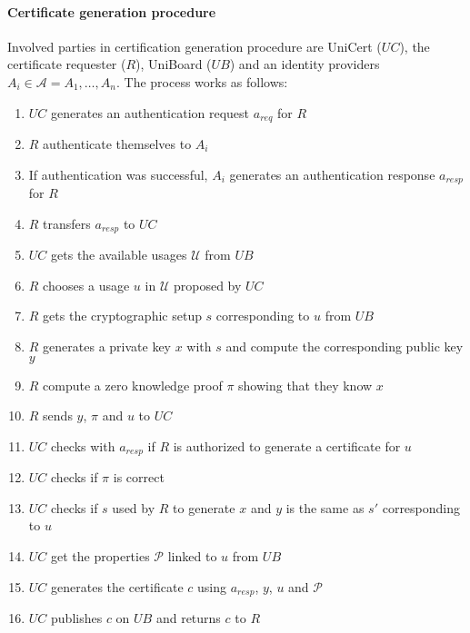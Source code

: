 \documentclass[bibtotoc,halfparskip,oneside]{scrreprt}
\begin{document}
\paragraph*{Certificate generation procedure}
Involved parties in certification generation procedure are UniCert ($UC$), the certificate requester ($R$), UniBoard ($UB$) and an identity providers $A_i \in \mathcal{A} = {A_1, \dots , A_n}$. The process works as follows:
\begin{enumerate}
	\item $UC$ generates an authentication request $a_{req}$ for $R$
	\item $R$ authenticate themselves to $A_i$
	\item If authentication was successful, $A_i$ generates an authentication response $a_{resp}$ for $R$
	\item $R$ transfers $a_{resp}$ to $UC$
	\item $UC$ gets the available usages $\mathcal{U}$ from $UB$    
	\item $R$ chooses a usage $u$ in $\mathcal{U}$ proposed by $UC$ 
	\item $R$ gets the cryptographic setup $s$ corresponding to $u$ from $UB$ 
	\item $R$ generates a private key $x$ with $s$ and compute the corresponding public key $y$
	\item $R$ compute a zero knowledge proof $\pi$ showing that they know $x$
	\item $R$ sends $y$, $\pi$ and $u$ to $UC$ 
	\item $UC$ checks with $a_{resp}$ if $R$ is authorized to generate a certificate for $u$ 
	\item $UC$ checks if $\pi$ is correct
	\item $UC$ checks if $s$ used by $R$ to generate $x$ and $y$ is the same as $s'$ corresponding to $u$
	\item $UC$ get the properties $\mathcal{P}$ linked to $u$ from $UB$ 
	\item $UC$ generates the certificate $c$ using $a_{resp}$, $y$, $u$ and $\mathcal{P}$   
	\item $UC$ publishes $c$ on $UB$ and returns $c$ to $R$
\end{enumerate} 
\end{document}
